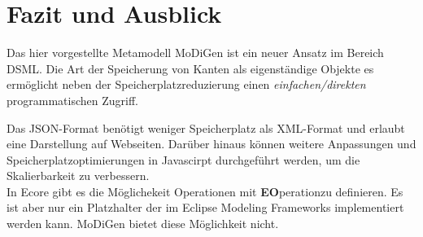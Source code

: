 \section{Fazit und Ausblick}
Das hier vorgestellte Metamodell MoDiGen ist ein neuer Ansatz im Bereich DSML. Die Art der Speicherung von Kanten als eigenständige Objekte es ermöglicht neben der Speicherplatzreduzierung einen \textit{einfachen/direkten} programmatischen Zugriff. 


Das JSON-Format benötigt weniger Speicherplatz als XML-Format und erlaubt eine Darstellung auf Webseiten. Darüber hinaus können weitere Anpassungen und Speicherplatzoptimierungen in Javascirpt durchgeführt werden, um die Skalierbarkeit zu verbessern. \\


In Ecore gibt es die Möglichekeit Operationen mit \textbf{EO}perationzu definieren. Es ist aber nur ein Platzhalter der im Eclipse Modeling Frameworks implementiert werden kann. MoDiGen bietet diese Möglichkeit nicht. \\



